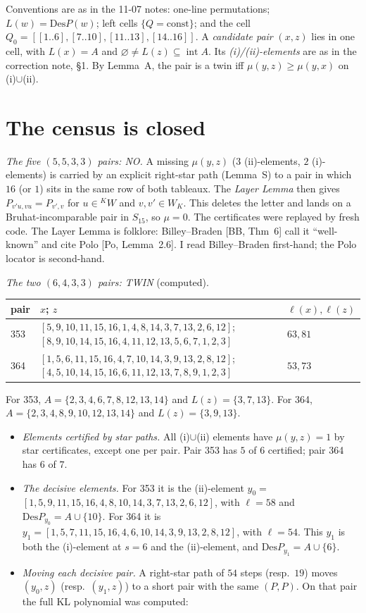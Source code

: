 \documentclass[11pt]{amsart}
\newcommand{\gr}[1]{\textsf{#1}}
\newcommand{\Des}{\mathrm{Des}}
\newcommand{\intr}{\operatorname{int}}
\theoremstyle{definition}
\begin{document}
\medskip
Conventions are as in the 11-07 notes: one-line permutations; $L(w)=\Des P(w)$; left cells $\{Q=\text{const}\}$; and the cell $Q_0=[[1..6],[7..10],[11..13],[14..16]]$. A \emph{candidate pair} $(x,z)$ lies in one cell, with $L(x)=A$ and $\varnothing\ne L(z)\subseteq\intr A$. Its \emph{(i)/(ii)-elements} are as in the correction note, \S1. By Lemma~A, the pair is a twin iff $\mu(y,z)\ge\mu(y,x)$ on (i)$\cup$(ii).

\section{The census is closed}

\emph{The five $(5,5,3,3)$ pairs: NO.} A missing $\mu(y,z)$ ($3$ (ii)-elements, $2$ (i)-elements) is carried by an explicit right-star path (Lemma~S) to a pair in which $16$ (or $1$) sits in the same row of both tableaux. The \emph{Layer Lemma} then gives $P_{v'u,vu}=P_{v',v}$ for $u\in{}^KW$ and $v,v'\in W_K$. This deletes the letter and lands on a Bruhat-incomparable pair in $S_{15}$, so $\mu=0$. The certificates were replayed by fresh code. The Layer Lemma is folklore: Billey--Braden [BB, Thm~6] call it ``well-known'' and cite Polo [Po, Lemma~2.6]. I read Billey--Braden first-hand; the Polo locator is second-hand.

\emph{The two $(6,4,3,3)$ pairs: TWIN} (\gr{computed}).

\smallskip
{\footnotesize\begin{tabular}{@{}lll@{}}\toprule
pair & $x$; \quad $z$ & $\ell(x),\ell(z)$\\\midrule
353 & $[5,9,10,11,15,16,1,4,8,14,3,7,13,2,6,12]$; \ $[8,9,10,14,15,16,4,11,12,13,5,6,7,1,2,3]$ & $63,81$\\
364 & $[1,5,6,11,15,16,4,7,10,14,3,9,13,2,8,12]$; \ $[4,5,10,14,15,16,6,11,12,13,7,8,9,1,2,3]$ & $53,73$\\\bottomrule
\end{tabular}}

\smallskip
For 353, $A=\{2,3,4,6,7,8,12,13,14\}$ and $L(z)=\{3,7,13\}$. For 364, $A=\{2,3,4,8,9,10,12,13,14\}$ and $L(z)=\{3,9,13\}$.

\begin{itemize}[leftmargin=*]
\item \emph{Elements certified by star paths.} All (i)$\cup$(ii) elements have $\mu(y,z)=1$ by star certificates, except one per pair. Pair 353 has $5$ of $6$ certified; pair 364 has $6$ of $7$.
\item \emph{The decisive elements.} For 353 it is the (ii)-element
\mbox{$y_0={}$}$[1,5,9,11,15,16,4,8,10,14,3,7,13,2,6,12]$, with $\ell=58$ and $\Des P_{y_0}=A\cup\{10\}$. For 364 it is
$y_1=[1,5,7,11,15,16,4,6,10,14,3,9,13,2,8,12]$, with $\ell=54$. This $y_1$ is both the (i)-element at $s=6$ and the (ii)-element, and $\Des P_{y_1}=A\cup\{6\}$.
\item \emph{Moving each decisive pair.} A right-star path of $54$ steps (resp.\ $19$) moves $(y_0,z)$ (resp.\ $(y_1,z)$) to a short pair with the same $(P,P)$. On that pair the full KL polynomial was computed:
\end{itemize}
\end{document}

